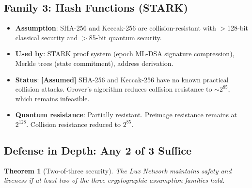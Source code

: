 \documentclass[11pt,a4paper]{article}
\newtheorem{theorem}{Theorem}[section]
\begin{document}
\subsection{Family 3: Hash Functions (STARK)}

\begin{itemize}[leftmargin=2em]
  \item \textbf{Assumption}: SHA-256 and Keccak-256 are collision-resistant with
        $>$128-bit classical security and $>$85-bit quantum security.
  \item \textbf{Used by}: STARK proof system (epoch ML-DSA signature compression),
        Merkle trees (state commitment), address derivation.
  \item \textbf{Status}: \textbf{[Assumed]} SHA-256 and Keccak-256 have no known
        practical collision attacks. Grover's algorithm reduces collision resistance
        to $\sim 2^{85}$, which remains infeasible.
  \item \textbf{Quantum resistance}: Partially resistant. Preimage resistance remains
        at $2^{128}$. Collision resistance reduced to $2^{85}$.
\end{itemize}

\subsection{Defense in Depth: Any 2 of 3 Suffice}

\begin{theorem}[Two-of-three security]
\label{thm:two-of-three}
The Lux Network maintains safety and liveness if at least two of the three
cryptographic assumption families hold.
\end{theorem}
\end{document}
